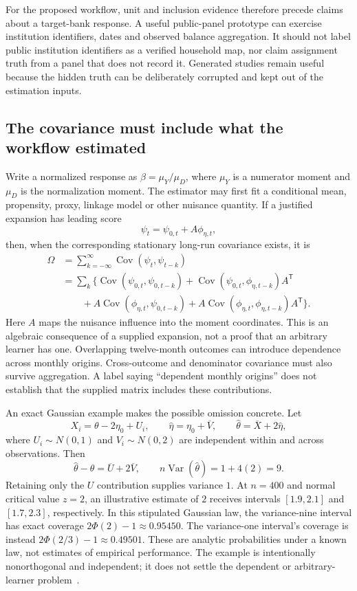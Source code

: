 For the proposed workflow, unit and inclusion evidence therefore precede
claims about a target-bank response. A useful public-panel prototype can
exercise institution identifiers, dates and observed balance aggregation.
It should not label public institution identifiers as a verified household
map, nor claim assignment truth from a panel that does not record it.
Generated studies remain useful because the hidden truth can be deliberately
corrupted and kept out of the estimation inputs.

\subsection{The covariance must include what the workflow estimated}

Write a normalized response as $\beta=\mu_Y/\mu_D$, where $\mu_Y$ is a
numerator moment and $\mu_D$ is the normalization moment. The estimator may
first fit a conditional mean, propensity, proxy, linkage model or other
nuisance quantity. If a justified expansion has leading score
\[
 \psi_t=\psi_{0,t}+A\phi_{\eta,t},
\]
then, when the corresponding stationary long-run covariance exists, it is
\begin{align*}
 \Omega
 &=\sum_{k=-\infty}^{\infty}
   \operatorname{Cov}(\psi_t,\psi_{t-k})\\
 &=\sum_k\bigl\{
   \operatorname{Cov}(\psi_{0,t},\psi_{0,t-k})
   +\operatorname{Cov}(\psi_{0,t},\phi_{\eta,t-k})A^{\mathsf T}
   \\
 &\qquad+A\operatorname{Cov}(\phi_{\eta,t},\psi_{0,t-k})
   +A\operatorname{Cov}(\phi_{\eta,t},\phi_{\eta,t-k})A^{\mathsf T}
   \bigr\}.
\end{align*}
Here $A$ maps the nuisance influence into the moment coordinates. This is an
algebraic consequence of a supplied expansion, not a proof that an arbitrary
learner has one. Overlapping twelve-month outcomes can introduce dependence
across monthly origins. Cross-outcome and denominator covariance must also
survive aggregation. A label saying ``dependent monthly origins'' does not
establish that the supplied matrix includes these contributions.

An exact Gaussian example makes the possible omission concrete. Let
\[
 X_i=\theta-2\eta_0+U_i,\qquad
 \widehat\eta=\eta_0+\overline V,\qquad
 \widehat\theta=\overline X+2\widehat\eta,
\]
where $U_i\sim N(0,1)$ and $V_i\sim N(0,2)$ are independent within and
across observations. Then
\[
 \widehat\theta-\theta=\overline U+2\overline V,
 \qquad n\operatorname{Var}(\widehat\theta)=1+4(2)=9.
\]
Retaining only the $U$ contribution supplies variance $1$. At $n=400$ and
normal critical value $z=2$, an illustrative estimate of $2$ receives intervals
$[1.9,2.1]$ and $[1.7,2.3]$, respectively. In this stipulated Gaussian law,
the variance-nine interval has exact coverage $2\Phi(2)-1\approx0.95450$.
The variance-one interval's coverage is instead
$2\Phi(2/3)-1\approx0.49501$. These are analytic probabilities under a known
law, not estimates of empirical performance. The example is intentionally
nonorthogonal and independent; it does not settle the dependent or
arbitrary-learner problem~\citep{exec13_funding_exact}.

